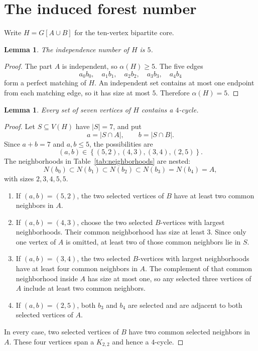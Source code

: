 \documentclass[11pt]{article}
\newtheorem{lemma}[theorem]{Lemma}
\newcommand{\set}[1]{\left\{#1\right\}}
\begin{document}
\section{The induced forest number}

Write $H=G[A\cup B]$ for the ten-vertex bipartite core.

\begin{lemma}\label{lem:alpha-core}
The independence number of $H$ is $5$.
\end{lemma}

\begin{proof}
The part $A$ is independent, so $\alpha(H)\ge5$. The five edges
\[
 a_0b_0,\quad a_1b_1,\quad a_2b_2,\quad a_3b_3,\quad a_4b_4
\]
form a perfect matching of $H$. An independent set contains at most one
endpoint from each matching edge, so it has size at most $5$. Therefore
$\alpha(H)=5$.
\end{proof}

\begin{lemma}\label{lem:seven-core}
Every set of seven vertices of $H$ contains a $4$-cycle.
\end{lemma}

\begin{proof}
Let $S\subseteq V(H)$ have $|S|=7$, and put
\[
 a=|S\cap A|,\qquad b=|S\cap B|.
\]
Since $a+b=7$ and $a,b\le5$, the possibilities are
\[
 (a,b)\in\set{(5,2),(4,3),(3,4),(2,5)}.
\]
The neighborhoods in Table~\ref{tab:neighborhoods} are nested:
\[
 N(b_0)\subset N(b_1)\subset N(b_2)\subset N(b_3)=N(b_4)=A,
\]
with sizes $2,3,4,5,5$.

\begin{enumerate}[label=(\alph*),leftmargin=2.5em]
  \item If $(a,b)=(5,2)$, the two selected vertices of $B$ have at least two
        common neighbors in $A$.
  \item If $(a,b)=(4,3)$, choose the two selected $B$-vertices with largest
        neighborhoods. Their common neighborhood has size at least $3$.
        Since only one vertex of $A$ is omitted, at least two of those common
        neighbors lie in $S$.
  \item If $(a,b)=(3,4)$, the two selected $B$-vertices with largest
        neighborhoods have at least four common neighbors in $A$. The
        complement of that common neighborhood inside $A$ has size at most
        one, so any selected three vertices of $A$ include at least two common
        neighbors.
  \item If $(a,b)=(2,5)$, both $b_3$ and $b_4$ are selected and are adjacent
        to both selected vertices of $A$.
\end{enumerate}

In every case, two selected vertices of $B$ have two common selected neighbors
in $A$. These four vertices span a $K_{2,2}$ and hence a $4$-cycle.
\end{proof}
\end{document}
